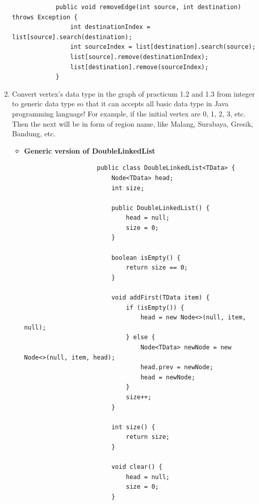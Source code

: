 \documentclass[12pt,titlepage]{article}
\begin{document}
\begin{enumerate}
{        \begin{verbatim}
            public void removeEdge(int source, int destination) throws Exception {
                int destinationIndex = list[source].search(destination);
                int sourceIndex = list[destination].search(source);
                list[source].remove(destinationIndex);
                list[destination].remove(sourceIndex);
            }
        \end{verbatim}
    }
    \pagebreak
    \item {
        Convert vertex's data type in the graph of practicum 1.2 and 1.3 from integer to generic data type so that it can accepts all basic data type
        in Java programming language! For example, if the initial vertex are 0, 1, 2, 3, etc. Then the next will be in form of region name, like Malang,
        Surabaya, Gresik, Bandung, etc.

        \begin{itemize}
            \item {
                \textbf{Generic version of DoubleLinkedList}

                \begin{verbatim}
                    public class DoubleLinkedList<TData> {
                        Node<TData> head;
                        int size;

                        public DoubleLinkedList() {
                            head = null;
                            size = 0;
                        }

                        boolean isEmpty() {
                            return size == 0;
                        }

                        void addFirst(TData item) {
                            if (isEmpty()) {
                                head = new Node<>(null, item, null);
                            } else {
                                Node<TData> newNode = new Node<>(null, item, head);
                                head.prev = newNode;
                                head = newNode;
                            }
                            size++;
                        }

                        int size() {
                            return size;
                        }

                        void clear() {
                            head = null;
                            size = 0;
                        }


\end{verbatim}}
\end{itemize}}
\end{enumerate}
\end{document}
